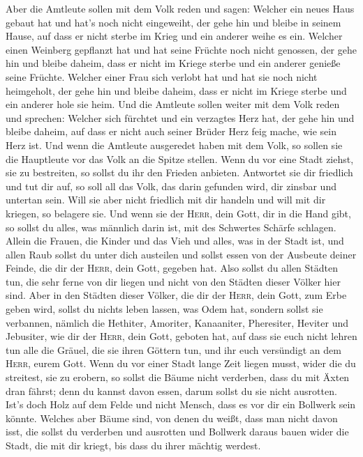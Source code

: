  Aber die Amtleute sollen mit dem Volk reden und sagen:
Welcher ein neues Haus gebaut hat und hat's noch nicht eingeweiht, der
gehe hin und bleibe in seinem Hause, auf dass er nicht sterbe im Krieg
und ein anderer weihe es ein.  Welcher einen Weinberg
gepflanzt hat und hat seine Früchte noch nicht genossen, der gehe hin
und bleibe daheim, dass er nicht im Kriege sterbe und ein anderer
genieße seine Früchte.  Welcher einer Frau sich verlobt
hat und hat sie noch nicht heimgeholt, der gehe hin und bleibe daheim,
dass er nicht im Kriege sterbe und ein anderer hole sie heim.
 Und die Amtleute sollen weiter mit dem Volk reden und
sprechen: Welcher sich fürchtet und ein verzagtes Herz hat, der gehe hin
und bleibe daheim, auf dass er nicht auch seiner Brüder Herz feig mache,
wie sein Herz ist.  Und wenn die Amtleute ausgeredet haben
mit dem Volk, so sollen sie die Hauptleute vor das Volk an die Spitze
stellen.  Wenn du vor eine Stadt ziehst, sie zu
bestreiten, so sollst du ihr den Frieden anbieten. 
Antwortet sie dir friedlich und tut dir auf, so soll all das Volk, das
darin gefunden wird, dir zinsbar und untertan sein.  Will
sie aber nicht friedlich mit dir handeln und will mit dir kriegen, so
belagere sie.  Und wenn sie der \textsc{Herr}, dein Gott,
dir in die Hand gibt, so sollst du alles, was männlich darin ist, mit
des Schwertes Schärfe schlagen.  Allein die Frauen, die
Kinder und das Vieh und alles, was in der Stadt ist, und allen Raub
sollst du unter dich austeilen und sollst essen von der Ausbeute deiner
Feinde, die dir der \textsc{Herr}, dein Gott, gegeben hat.
 Also sollst du allen Städten tun, die sehr ferne von dir
liegen und nicht von den Städten dieser Völker hier sind.
 Aber in den Städten dieser Völker, die dir der
\textsc{Herr}, dein Gott, zum Erbe geben wird, sollst du nichts leben
lassen, was Odem hat,  sondern sollst sie verbannen,
nämlich die Hethiter, Amoriter, Kanaaniter, Pheresiter, Heviter und
Jebusiter, wie dir der \textsc{Herr}, dein Gott, geboten hat,
 auf dass sie euch nicht lehren tun alle die Gräuel, die
sie ihren Göttern tun, und ihr euch versündigt an dem \textsc{Herr},
eurem Gott.  Wenn du vor einer Stadt lange Zeit liegen
musst, wider die du streitest, sie zu erobern, so sollst die Bäume nicht
verderben, dass du mit Äxten dran fährst; denn du kannst davon essen,
darum sollst du sie nicht ausrotten. Ist's doch Holz auf dem Felde und
nicht Mensch, dass es vor dir ein Bollwerk sein könnte. 
Welches aber Bäume sind, von denen du weißt, dass man nicht davon isst,
die sollst du verderben und ausrotten und Bollwerk daraus bauen wider
die Stadt, die mit dir kriegt, bis dass du ihrer mächtig werdest.

